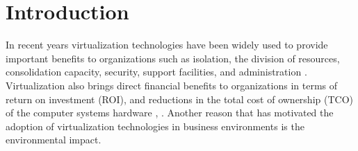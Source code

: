 	\section {Introduction}\label{sec:introduction}



	
	
	
	In recent years virtualization technologies have been widely used to provide important benefits to organizations such as isolation, the division of resources, consolidation capacity, security, support facilities, and administration \cite{Varasteh2017}.
	Virtualization also brings direct financial benefits to organizations in terms of return on investment (ROI), and reductions in the total cost of ownership (TCO) of the computer systems hardware \cite{Solis2014}, \cite{AbdElRahem2016}. Another reason that has motivated the adoption of virtualization technologies in business environments is the environmental impact.
	
